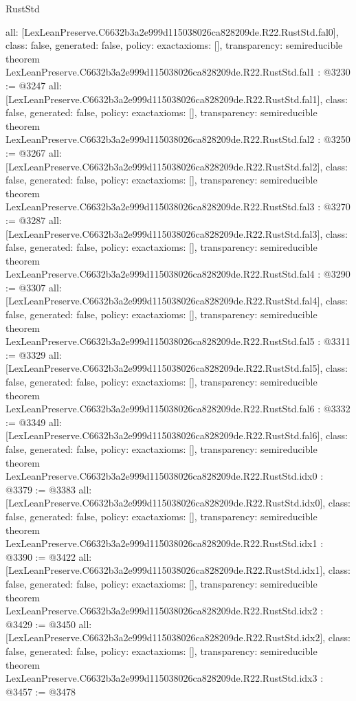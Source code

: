\begin{lexlean}{RustStd}
\begin{coremodule}
{  all: [LexLeanPreserve.C6632b3a2e999d115038026ca828209de.R22.RustStd.fal0],
  class: false,
  generated: false,
  policy: exact{axioms: []},
  transparency: semireducible
}
theorem LexLeanPreserve.C6632b3a2e999d115038026ca828209de.R22.RustStd.fal1 : @3230 := @3247 {
  all: [LexLeanPreserve.C6632b3a2e999d115038026ca828209de.R22.RustStd.fal1],
  class: false,
  generated: false,
  policy: exact{axioms: []},
  transparency: semireducible
}
theorem LexLeanPreserve.C6632b3a2e999d115038026ca828209de.R22.RustStd.fal2 : @3250 := @3267 {
  all: [LexLeanPreserve.C6632b3a2e999d115038026ca828209de.R22.RustStd.fal2],
  class: false,
  generated: false,
  policy: exact{axioms: []},
  transparency: semireducible
}
theorem LexLeanPreserve.C6632b3a2e999d115038026ca828209de.R22.RustStd.fal3 : @3270 := @3287 {
  all: [LexLeanPreserve.C6632b3a2e999d115038026ca828209de.R22.RustStd.fal3],
  class: false,
  generated: false,
  policy: exact{axioms: []},
  transparency: semireducible
}
theorem LexLeanPreserve.C6632b3a2e999d115038026ca828209de.R22.RustStd.fal4 : @3290 := @3307 {
  all: [LexLeanPreserve.C6632b3a2e999d115038026ca828209de.R22.RustStd.fal4],
  class: false,
  generated: false,
  policy: exact{axioms: []},
  transparency: semireducible
}
theorem LexLeanPreserve.C6632b3a2e999d115038026ca828209de.R22.RustStd.fal5 : @3311 := @3329 {
  all: [LexLeanPreserve.C6632b3a2e999d115038026ca828209de.R22.RustStd.fal5],
  class: false,
  generated: false,
  policy: exact{axioms: []},
  transparency: semireducible
}
theorem LexLeanPreserve.C6632b3a2e999d115038026ca828209de.R22.RustStd.fal6 : @3332 := @3349 {
  all: [LexLeanPreserve.C6632b3a2e999d115038026ca828209de.R22.RustStd.fal6],
  class: false,
  generated: false,
  policy: exact{axioms: []},
  transparency: semireducible
}
theorem LexLeanPreserve.C6632b3a2e999d115038026ca828209de.R22.RustStd.idx0 : @3379 := @3383 {
  all: [LexLeanPreserve.C6632b3a2e999d115038026ca828209de.R22.RustStd.idx0],
  class: false,
  generated: false,
  policy: exact{axioms: []},
  transparency: semireducible
}
theorem LexLeanPreserve.C6632b3a2e999d115038026ca828209de.R22.RustStd.idx1 : @3390 := @3422 {
  all: [LexLeanPreserve.C6632b3a2e999d115038026ca828209de.R22.RustStd.idx1],
  class: false,
  generated: false,
  policy: exact{axioms: []},
  transparency: semireducible
}
theorem LexLeanPreserve.C6632b3a2e999d115038026ca828209de.R22.RustStd.idx2 : @3429 := @3450 {
  all: [LexLeanPreserve.C6632b3a2e999d115038026ca828209de.R22.RustStd.idx2],
  class: false,
  generated: false,
  policy: exact{axioms: []},
  transparency: semireducible
}
theorem LexLeanPreserve.C6632b3a2e999d115038026ca828209de.R22.RustStd.idx3 : @3457 := @3478 {
}
\end{coremodule}
\end{lexlean}
